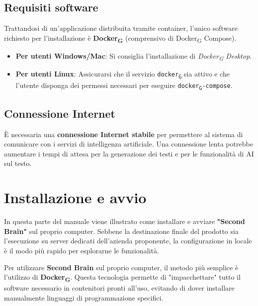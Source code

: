 \documentclass[11pt,a4paper]{article}
\newcommand{\gls}[1]{#1\textsubscript{G}}
\begin{document}
\subsection{Requisiti software}
Trattandosi di un'applicazione distribuita tramite container, l'unico software richiesto per l'installazione è \textbf{\gls{Docker}} (comprensivo di \gls{Docker} Compose).
\begin{itemize}
    \item \textbf{Per utenti Windows/Mac}: Si consiglia l'installazione di \textit{\gls{Docker} Desktop}.
    \item \textbf{Per utenti Linux}: Assicurarsi che il servizio \texttt{\gls{docker}} sia attivo e che l'utente disponga dei permessi necessari per eseguire \texttt{\gls{docker}-compose}.
\end{itemize}

\subsection{Connessione Internet}
È necessaria una \textbf{connessione Internet stabile} per permettere al sistema di comunicare con i servizi di intelligenza artificiale. Una connessione lenta potrebbe aumentare i tempi di attesa per la generazione dei testi e per le funzionalità di AI sul testo.


\newpage

\section{Installazione e avvio}
In questa parte del manuale viene illustrato come installare e avviare \textbf{"Second Brain"} sul proprio computer. Sebbene la destinazione finale del prodotto sia l'esecuzione su server dedicati dell'azienda proponente, la configurazione in locale è il modo più rapido per esplorarne le funzionalità.

Per utilizzare \textbf{Second Brain} sul proprio computer, il metodo più semplice è l'utilizzo di \textbf{\gls{Docker}}. Questa tecnologia permette di "impacchettare" tutto il software necessario in contenitori pronti all'uso, evitando di dover installare manualmente linguaggi di programmazione specifici.
\end{document}
